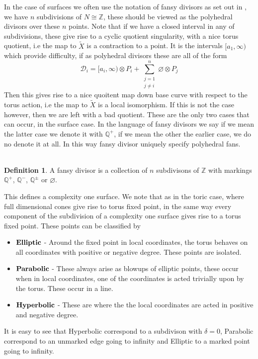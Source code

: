 \documentclass[11pt]{report}
\theoremstyle{definition}
\theoremstyle{definition}
\theoremstyle{definition}
\theoremstyle{definition}
\newtheorem{dfn}[thm]{Definition}
\theoremstyle{definition}
\theoremstyle{definition}
\theoremstyle{definition}
\begin{document}
In the case of surfaces we often use the notation of fansy divisors as set out in \cite{Suss}, we have $n$ subdivisions of $N \cong \mathbb{Z}$, these should be viewed as the polyhedral divisors over these $n$ points. Note that if we have a closed interval in any of subdivisions, these give rise to a cyclic quotient singularity, with a nice torus quotient, i.e the map to $\tilde{X}$ is a contraction to a point. It is the intervals $[a_1, \infty )$ which provide difficulty, if as polyhedral divisors these are all of the form 
\[
\mathcal{D}_i = [a_i, \infty) \otimes P_i + \sum_{\substack{j = 1 \\ j \neq i}}^n \varnothing \otimes P_j
\]
Then this gives rise to a nice quoitent map down base curve with respect to the torus action, i.e  the map to $\tilde{X}$ is a local isomorphism. If this is not the case however, then we are left with a bad quotient. These are the only two cases that can occur, in the surface case. In the language of fansy divisors we say if we mean the latter case we denote it with $\mathbb{Q}^+$, if we mean the other the earlier case, we do no denote it at all. In this way fansy divisor uniquely specify polyhedral fans.
\\
\\
\begin{dfn}
A fansy divisor is a collection of $n$ subdivisons of $\mathbb{Z}$ with markings $\mathbb{Q}^+$, $\mathbb{Q}^-$, $\mathbb{Q}^\pm$ or $\varnothing$. 
\end{dfn}
This defines a complexity one surface. We note that as in the toric case, where full dimensional cones give rise to torus fixed point, in the same way every component of the subdivision of a complexity one surface gives rise to a torus fixed point. These points can be classified by 
\begin{itemize}
\item $\bold{Elliptic}$ - Around the fixed point in local coordinates, the torus behaves on all coordinates with positive or negative degree. These points are isolated.
\item $\bold{Parabolic}$ - These always arise as blowups of elliptic points, these occur when in local coordinates, one of the coordinates is acted trivially upon by the torus. These occur in a line.
\item $\bold{Hyperbolic}$ - These are where the the local coordinates are acted in positive and negative degree.
\end{itemize}
It is easy to see that Hyperbolic correspond to a subdivison with $\delta = 0$, Parabolic correspond to an unmarked edge going to infinity and Elliptic to a marked point going to infinity.
\end{document}
